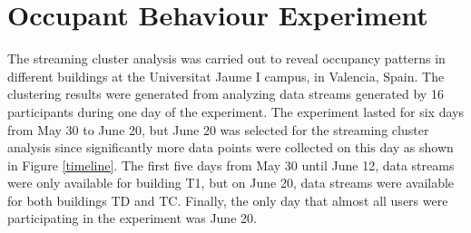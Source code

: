 




\newpage
\section{Occupant Behaviour Experiment}
The streaming cluster analysis was carried out to reveal occupancy patterns in different buildings at the Universitat Jaume I campus, in Valencia, Spain. The clustering results were generated from analyzing data streams generated by 16 participants during one day of the experiment. The experiment lasted for six days from May 30 to June 20, but June 20 was selected for the streaming cluster analysis since significantly more data points were collected on this day as shown in Figure \ref{timeline}. The first five days from May 30 until June 12, data streams were only available for building T1, but on June 20, data streams were available for both buildings TD and TC. Finally, the only day that almost all users were participating in the experiment was June 20.

